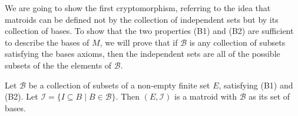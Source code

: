 We are going to show the first cryptomorphism, referring to the idea that matroids can be defined not by the collection of independent sets but by its collection of bases. To show that the two properties (B1) and (B2) are sufficient to describe the bases of $M$, we will prove that if $\mathcal{B}$ is any collection of subsets satisfying the bases axioms, then the independent sets are all of the possible subsets of the the elements of $\mathcal{B}$.

\begin{theorem}\label{thm:basis-axioms-form-matroid}
    Let $\mathcal{B}$ be a collection of subsets of a non-empty finite set $E$, satisfying (B1) and (B2). Let $\mathcal{I}=\{ I\subseteq B \; | \; B\in\mathcal{B} \}$. Then $(E,\mathcal{I})$ is a matroid with $\mathcal{B}$ as its set of bases.
\end{theorem}


